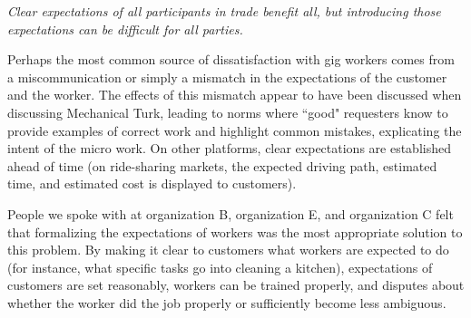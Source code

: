 \textit{Clear expectations of all participants in trade benefit all, but introducing those expectations can be difficult for all parties.}

Perhaps the most common source of dissatisfaction with gig workers comes from a miscommunication or simply a mismatch in the expectations of the customer and the worker.
The effects of this mismatch appear to have been discussed when discussing Mechanical Turk, leading to norms where ``good" requesters know to provide examples of correct work and highlight common mistakes, explicating the intent of the micro work.
On other platforms, clear expectations are established ahead of time
(on ride-sharing markets, the expected driving path, estimated time, and estimated cost is displayed to customers).

People we spoke with at organization B, organization E, and organization C felt that formalizing the expectations of workers was the most appropriate solution to this problem.
By making it clear to customers what workers are expected to do
(for instance, what specific tasks go into cleaning a kitchen),
expectations of customers are set reasonably, workers can be trained properly,
and disputes about whether the worker did the job properly or sufficiently become less ambiguous.

